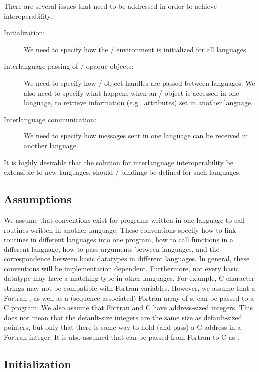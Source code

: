 There are several issues that need to be addressed in order to achieve
interoperability.
\begin{description}
\item[Initialization:]  We need to specify how the \MPI/ environment is
initialized for all languages.
\item[Interlanguage passing of \MPI/ opaque objects:]
We need to specify how \MPI/ object handles are passed between languages.
We also need to specify what happens when an \MPI/
object is accessed in one language, to retrieve information (e.g., attributes) set in another language.
\item[Interlanguage communication:]
We need to specify how messages sent in one language can be received
in another language.
\end{description}

It is highly desirable that the solution for interlanguage interoperability
be extensible to new languages, should \MPI/ bindings be defined for
such languages.

\subsection{Assumptions}

We assume that conventions exist for programs written in one language to call
routines
written in another language.
These conventions
specify how to link routines in different languages into one
program, how to call functions in a different language, how to
pass  arguments  between languages, and the correspondence
between basic datatypes in different languages.  In general,
these conventions will be implementation dependent.
Furthermore, not every basic datatype may
have a matching type in other languages.  For example,
C
character strings may not be compatible with Fortran
 variables.  However, we assume that a Fortran
,
as well as a (sequence associated) Fortran array of s,
can be passed to a C program.
We also assume that Fortran
  and C have address-sized integers.
This does not mean that the default-size integers are the same size as
default-sized pointers, but only that there is some way to hold (and pass) a
C address in a Fortran integer.
It is also assumed that  can be passed from Fortran to C as .




\subsection{Initialization}
\label{sec:misc-lang-interop:initialization}

